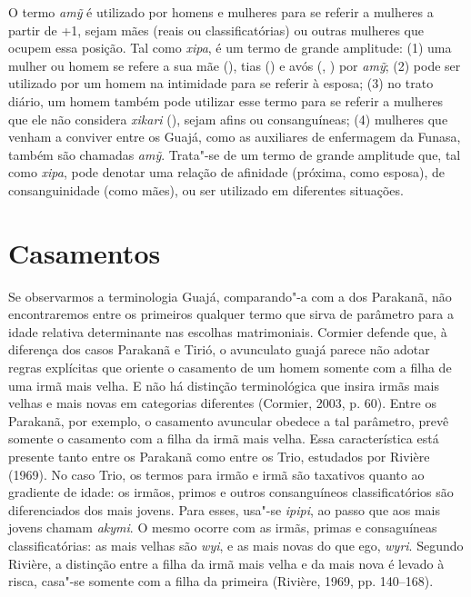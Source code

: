 O termo \emph{amỹ} é utilizado por homens e mulheres para se referir a
mulheres a partir de +1, sejam mães (reais ou classificatórias) ou
outras mulheres que ocupem essa posição. Tal como \emph{xipa}, é um
termo de grande amplitude: (1) uma mulher ou homem se refere a sua mãe
(), tias () e avós (, ) por \emph{amỹ}; (2) pode ser utilizado
por um homem na intimidade para se referir à esposa; (3) no trato
diário, um homem também pode utilizar esse termo para se referir a
mulheres que ele não considera \emph{xikari} (), sejam afins ou
consanguíneas; (4) mulheres que venham a conviver entre os Guajá, como
as auxiliares de enfermagem da Funasa, também são chamadas \emph{amỹ}.
Trata"-se de um termo de grande amplitude que, tal como \emph{xipa}, pode
denotar uma relação de afinidade (próxima, como esposa), de
consanguinidade (como mães), ou ser utilizado em diferentes situações.

\section{Casamentos}\label{casamentos}

Se observarmos a terminologia Guajá, comparando"-a com a dos Parakanã,
não encontraremos entre os primeiros qualquer termo que sirva de
parâmetro para a idade relativa determinante nas escolhas matrimoniais.
Cormier defende que, à diferença dos casos Parakanã e Tirió, o
avunculato guajá parece não adotar regras explícitas que oriente o
casamento de um homem somente com a filha de uma irmã mais velha. E não
há distinção terminológica que insira irmãs mais velhas e mais novas em
categorias diferentes (Cormier, 2003, p. 60). Entre os Parakanã, por
exemplo, o casamento avuncular obedece a tal parâmetro, prevê somente o
casamento com a filha da irmã mais velha. Essa característica está
presente tanto entre os Parakanã como entre os Trio, estudados por
Rivière (1969). No caso Trio, os termos para irmão e irmã são taxativos
quanto ao gradiente de idade: os irmãos, primos e outros consanguíneos
classificatórios são diferenciados dos mais jovens. Para esses, usa"-se
\emph{ipipi}, ao passo que aos mais jovens chamam \emph{akymi}. O mesmo
ocorre com as irmãs, primas e consaguíneas classificatórias: as mais
velhas são \emph{wyi}, e as mais novas do que ego, \emph{wyri}. Segundo
Rivière, a distinção entre a filha da irmã mais velha e da mais nova é
levado à risca, casa"-se somente com a filha da primeira (Rivière, 1969,
pp. 140--168).

